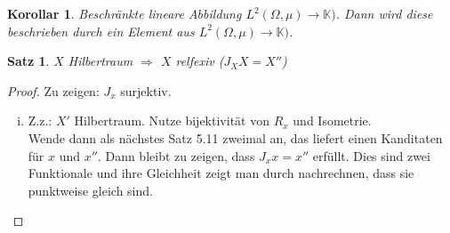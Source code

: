 \documentclass[ngerman]{report}
\theoremstyle{plain}%
\newtheorem{thm}{Satz}[chapter]
\newtheorem*{cor*}{Korollar}
\theoremstyle{definition}%
\theoremstyle{myStyle}
\newcommand{\K}{\mathbb{K}}
\newcommand{\df}[1][]{%
	\overset{#1}{\Rightarrow}
}
\begin{document}
	\begin{cor*}
		Beschränkte lineare Abbildung $L^2(\Omega, \mu) \to \K)$. Dann wird diese beschrieben durch ein Element aus $L^2(\Omega, \mu) \to \K)$.
	\end{cor*}

	\begin{thm}
		$X$ Hilbertraum $\df$ $X$ relfexiv ($J_X X = X''$)
	\end{thm}

	\begin{proof}
		Zu zeigen: $J_x$ surjektiv.
		\begin{enumerate}[(i)]
			\item Z.z.: $X'$ Hilbertraum. Nutze bijektivität von $R_x$ und Isometrie.\\ 
			Wende dann als nächstes Satz 5.11 zweimal an, das liefert einen Kanditaten für $x$ und $x''$.
			Dann bleibt zu zeigen, dass $J_x x = x''$ erfüllt.
			Dies sind zwei Funktionale und ihre Gleichheit zeigt man durch nachrechnen, dass sie punktweise gleich sind.
		\end{enumerate}

	\end{proof}
\end{document}
